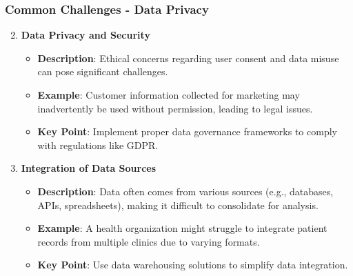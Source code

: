 \documentclass[aspectratio=169]{beamer}
\begin{document}
\begin{frame}[fragile]
    \frametitle{Common Challenges - Data Privacy}
    \begin{enumerate}
        \setcounter{enumi}{1}
        \item \textbf{Data Privacy and Security}
        \begin{itemize}
            \item \textbf{Description}: Ethical concerns regarding user consent and data misuse can pose significant challenges.
            \item \textbf{Example}: Customer information collected for marketing may inadvertently be used without permission, leading to legal issues.
            \item \textbf{Key Point}: Implement proper data governance frameworks to comply with regulations like GDPR.
        \end{itemize}
        
        \item \textbf{Integration of Data Sources}
        \begin{itemize}
            \item \textbf{Description}: Data often comes from various sources (e.g., databases, APIs, spreadsheets), making it difficult to consolidate for analysis.
            \item \textbf{Example}: A health organization might struggle to integrate patient records from multiple clinics due to varying formats.
            \item \textbf{Key Point}: Use data warehousing solutions to simplify data integration.
        \end{itemize}
    \end{enumerate}
\end{frame}
\end{document}
